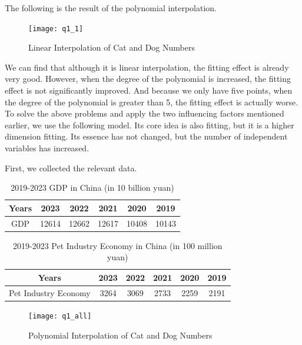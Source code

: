 \documentclass[withoutpreface,bwprint]{cumcmthesis} %
\begin{document}
\par The following is the result of the polynomial interpolation.
\clearpage
\begin{figure}[htbp]
	\centering
	\texttt{[image: q1\_1]}
	\caption{Linear Interpolation of Cat and Dog Numbers}
\end{figure}
\par We can find that although it is linear interpolation, the fitting effect is already very good.
However, when the degree of the polynomial is increased, the fitting effect is not significantly improved.
And because we only have five points, when the degree of the polynomial is greater than 5, the fitting effect is actually worse.
To solve the above problems and apply the two influencing factors mentioned earlier, we use the following model.
Its core idea is also fitting, but it is a higher dimension fitting.
Its essence has not changed, but the number of independent variables has increased.
\par First, we collected the relevant data.
\begin{table}[!htbp]
    \caption{2019-2023 GDP in China (in 10 billion yuan)\cite{2}} \centering
    \begin{tabular}{cccccc}
    \toprule[1.5pt]
    Years & 2023 & 2022 & 2021 & 2020 & 2019 \\
    \midrule[1pt]
    GDP & 12614 & 12662 & 12617 & 10408 & 10143 \\
    \bottomrule[1.5pt]
    \end{tabular}
\end{table}
\begin{table}[!htbp]
    \caption{2019-2023 Pet Industry Economy in China (in 100 million yuan)\cite{3}} \centering
    \begin{tabular}{cccccc}
    \toprule[1.5pt]
    Years & 2023 & 2022 & 2021 & 2020 & 2019 \\
    \midrule[1pt]
    Pet Industry Economy & 3264 & 3069 & 2733 & 2259 & 2191 \\
    \bottomrule[1.5pt]
    \end{tabular}
\end{table}
\begin{figure}[htbp]
	\centering
	\texttt{[image: q1\_all]}
	\caption{Polynomial Interpolation of Cat and Dog Numbers}
\end{figure}
\clearpage
\end{document}
